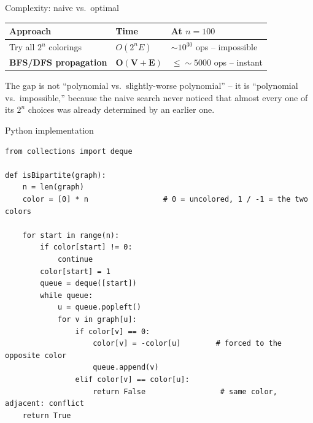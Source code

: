\documentclass[11pt,aspectratio=169]{beamer}
\begin{document}
\begin{frame}{Complexity: naive vs.\ optimal}
  \begin{center}
  \begin{tabular}{@{}lll@{}}
    \toprule
    Approach & Time & At $n=100$ \\
    \midrule
    Try all $2^n$ colorings & $O(2^n E)$ & $\sim 10^{30}$ ops -- impossible \\
    \textbf{BFS/DFS propagation} & $\boldsymbol{O(V+E)}$ & $\le \sim 5000$ ops --
    instant \\
    \bottomrule
  \end{tabular}
  \end{center}
  The gap is not ``polynomial vs.\ slightly-worse polynomial'' -- it is
  ``polynomial vs.\ impossible,'' because the naive search never noticed that almost
  every one of its $2^n$ choices was already determined by an earlier one.
\end{frame}

\begin{frame}[fragile]{Python implementation}
  \begin{lstlisting}[style=py,aboveskip=0pt,belowskip=0pt]
from collections import deque

def isBipartite(graph):
    n = len(graph)
    color = [0] * n                 # 0 = uncolored, 1 / -1 = the two colors

    for start in range(n):
        if color[start] != 0:
            continue
        color[start] = 1
        queue = deque([start])
        while queue:
            u = queue.popleft()
            for v in graph[u]:
                if color[v] == 0:
                    color[v] = -color[u]        # forced to the opposite color
                    queue.append(v)
                elif color[v] == color[u]:
                    return False                 # same color, adjacent: conflict
    return True
  \end{lstlisting}
\end{frame}
\end{document}
